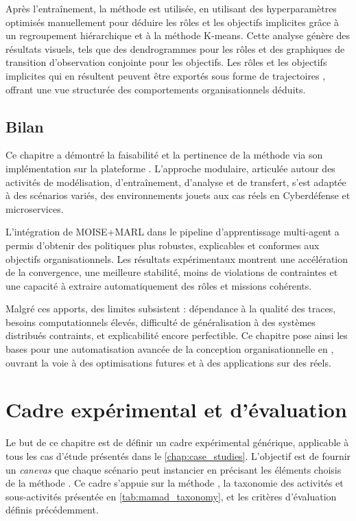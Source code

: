 Après l'entraînement, la méthode  est utilisée, en utilisant des hyperparamètres optimisés manuellement pour déduire les rôles et les objectifs implicites grâce à un regroupement hiérarchique et à la méthode K-means. Cette analyse génère des résultats visuels, tels que des dendrogrammes pour les rôles et des graphiques de transition d'observation conjointe pour les objectifs. Les rôles et les objectifs implicites qui en résultent peuvent être exportés sous forme de trajectoires , offrant une vue structurée des comportements organisationnels déduits.

\section{Bilan}

Ce chapitre a démontré la faisabilité et la pertinence de la méthode  via son implémentation sur la plateforme . L'approche modulaire, articulée autour des activités de modélisation, d'entraînement, d'analyse et de transfert, s'est adaptée à des scénarios variés, des environnements jouets aux cas réels en Cyberdéfense et microservices.

L'intégration de MOISE+MARL dans le pipeline d'apprentissage multi-agent a permis d'obtenir des politiques plus robustes, explicables et conformes aux objectifs organisationnels. Les résultats expérimentaux montrent une accélération de la convergence, une meilleure stabilité, moins de violations de contraintes et une capacité à extraire automatiquement des rôles et missions cohérents.

Malgré ces apports, des limites subsistent : dépendance à la qualité des traces, besoins computationnels élevés, difficulté de généralisation à des systèmes distribués contraints, et explicabilité encore perfectible. Ce chapitre pose ainsi les bases pour une automatisation avancée de la conception organisationnelle en , ouvrant la voie à des optimisations futures et à des applications sur des  réels.

\clearpage
\thispagestyle{empty}
\null
\newpage


\chapter{Cadre expérimental et d'évaluation}
\label{chap:cadre_experimental}

Le but de ce chapitre est de définir un cadre expérimental générique, applicable à tous les cas d'étude présentés dans le \autoref{chap:case_studies}. L'objectif est de fournir un \textit{canevas} que chaque scénario peut instancier en précisant les éléments choisis de la méthode . Ce cadre s'appuie sur la méthode , la taxonomie des activités et sous-activités présentée en \autoref{tab:mamad_taxonomy}, et les critères d'évaluation définis précédemment.

